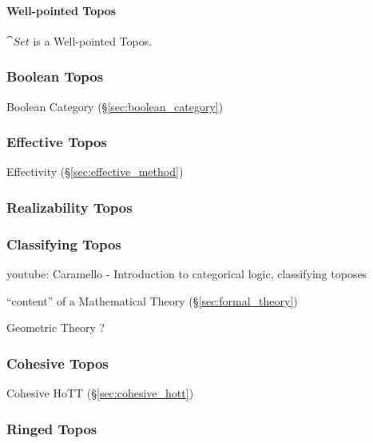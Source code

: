 \paragraph{Well-pointed Topos}\label{sec:wellpointed_topos}\hfill

$\cat{Set}$ is a Well-pointed Topos.



\subsubsection{Boolean Topos}\label{sec:boolean_topos}

Boolean Category (\S\ref{sec:boolean_category})



\subsubsection{Effective Topos}\label{sec:effective_topos}

Effectivity (\S\ref{sec:effective_method})



\subsubsection{Realizability Topos}\label{sec:realizability_topos}

\subsubsection{Classifying Topos}\label{sec:classifying_topos}

youtube: Caramello - Introduction to categorical logic, classifying
toposes

``content'' of a Mathematical Theory (\S\ref{sec:formal_theory})

Geometric Theory ?



\subsubsection{Cohesive Topos}\label{sec:cohesive_topos}

Cohesive HoTT (\S\ref{sec:cohesive_hott})



\subsubsection{Ringed Topos}\label{sec:ringed_topos}

